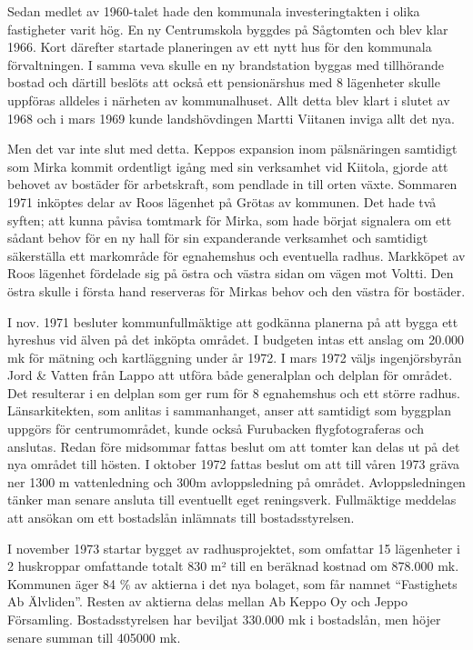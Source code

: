 

Sedan medlet av 1960-talet hade den kommunala investeringtakten i olika fastigheter varit hög. En ny Centrumskola byggdes på Sågtomten och blev klar 1966. Kort därefter startade planeringen av ett nytt hus för den kommunala förvaltningen. I samma veva skulle en ny brandstation byggas med tillhörande bostad och därtill beslöts att också ett pensionärshus med 8 lägenheter skulle uppföras alldeles i närheten av kommunalhuset. Allt detta blev klart i slutet av 1968 och i mars 1969 kunde landshövdingen Martti Viitanen inviga allt det nya.

Men det var inte slut med detta. Keppos expansion inom pälsnäringen samtidigt som Mirka kommit ordentligt igång med sin verksamhet vid Kiitola, gjorde att behovet av bostäder för arbetskraft, som pendlade in till orten växte. Sommaren 1971 inköptes delar av Roos lägenhet på Grötas av kommunen. Det hade två syften; att kunna påvisa tomtmark för Mirka, som hade börjat signalera om ett sådant behov för en ny hall för sin expanderande verksamhet och samtidigt säkerställa ett markområde för egnahemshus och eventuella radhus. Markköpet av Roos lägenhet fördelade sig på östra och västra sidan om vägen mot Voltti. Den östra skulle i första hand reserveras för Mirkas behov och den västra för bostäder.

I nov. 1971 besluter kommunfullmäktige att godkänna planerna på att bygga ett hyreshus vid älven på det inköpta området. I budgeten intas ett anslag om 20.000 mk för mätning och kartläggning under år 1972. I mars 1972 väljs ingenjörsbyrån Jord \& Vatten från Lappo att utföra både generalplan och delplan för området. Det resulterar i en delplan som ger rum för 8 egnahemshus och ett större radhus. Länsarkitekten, som anlitas i sammanhanget, anser att samtidigt som byggplan uppgörs för centrumområdet, kunde också Furubacken flygfotograferas och anslutas. Redan före midsommar fattas beslut om att tomter kan delas ut på det nya området till hösten. I oktober 1972 fattas beslut om att till våren 1973 gräva ner 1300 m vattenledning och 300m avloppsledning på området. Avloppsledningen tänker man senare ansluta till eventuellt eget reningsverk. Fullmäktige meddelas att ansökan om ett bostadslån inlämnats till bostadsstyrelsen.

I november 1973 startar bygget av radhusprojektet, som omfattar 15 lägenheter i 2 huskroppar omfattande totalt 830 m² till en beräknad kostnad om 878.000 mk. Kommunen äger 84 \% av aktierna i det nya bolaget, som får namnet ``Fastighets Ab Älvliden''. Resten av aktierna delas mellan Ab Keppo Oy och Jeppo Församling. Bostadsstyrelsen har beviljat 330.000 mk i bostadslån, men höjer senare summan till 405000 mk.

